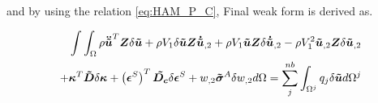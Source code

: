 \documentclass[main.tex]{subfiles}
\begin{document}
and by using the relation \ref{eq:HAM_P_C}, Final weak form is derived as.

\begin{equation*}
\begin{split}
\int \int_\Omega 
\rho \boldsymbol{\ddot{\tilde{u}}}^T \boldsymbol{Z} \delta \boldsymbol{{\tilde{u}}}
+  
\rho V_1 \delta \boldsymbol{\tilde{u}} \boldsymbol{Z} \boldsymbol{\dot{\tilde{u}}}_{,2} 
+ 
\rho V_1  \boldsymbol{\tilde{u}} \boldsymbol{Z} \delta \boldsymbol{\dot{\tilde{u}}}_{,2} 
-
\rho V_1^2 \boldsymbol{\tilde{u}}_{,2} \boldsymbol{Z} \delta \boldsymbol{\tilde{u}}_{,2}
\\ 
+ 
\boldsymbol{\kappa}^T \boldsymbol{\tilde{D}} \delta \boldsymbol{\kappa} 
+
\left(\boldsymbol{\epsilon}^S\right)^T \boldsymbol{\tilde{D_c}} \delta\boldsymbol{\epsilon}^S 
+
 w_{, 2} \boldsymbol{\tilde{\sigma}}^A  \delta w_{, 2}  d \Omega     
 =  
\sum_j^{nb} \int_{\Omega^j} q_j \delta \boldsymbol{\tilde{u}}  d \Omega^j 
\end{split} 
\end{equation*}
\end{document}
